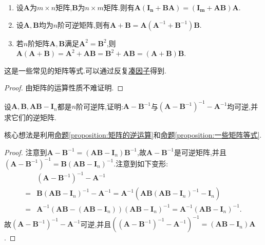 \documentclass[../../main.tex]{subfiles}%
\begin{document}
\begin{proposition}[一些矩阵等式]\label{proposition:一些矩阵等式}
\begin{enumerate}
\item 设$\boldsymbol{A}$为$m\times n$矩阵,$\boldsymbol{B}$为$n\times m$矩阵.则有$\boldsymbol{A}\left( \boldsymbol{I}_{\boldsymbol{n}}+\boldsymbol{BA} \right) =\left( \boldsymbol{I}_{\boldsymbol{m}}+\boldsymbol{AB} \right) \boldsymbol{A}$.

\item 设$\boldsymbol{A},\boldsymbol{B}$均为$n$阶可逆矩阵,则有$\boldsymbol{A}+\boldsymbol{B}=\boldsymbol{A}(\boldsymbol{A}^{-1}+\boldsymbol{B}^{-1})\boldsymbol{B}$.

\item 若$n$阶矩阵$\boldsymbol{A},\boldsymbol{B}$满足$\boldsymbol{A}^2=\boldsymbol{B}^2$,则$\boldsymbol{A}(\boldsymbol{A}+\boldsymbol{B})=\boldsymbol{A}^2+\boldsymbol{AB}=\boldsymbol{B}^2+\boldsymbol{AB}=(\boldsymbol{A}+\boldsymbol{B})\boldsymbol{B}$.
\end{enumerate}
\end{proposition}
\begin{note}
这是一些常见的矩阵等式.可以通过反复\hyperref[proposition:矩阵的逆运算]{凑因子}得到.
\end{note}
\begin{proof}
由矩阵的运算性质不难证明.
\end{proof}

\begin{example}\label{example:凑因子例1}
设\(\boldsymbol{A},\boldsymbol{B},\boldsymbol{AB}-\boldsymbol{I}_{n}\)都是\(n\)阶可逆阵,证明:\(\boldsymbol{A}-\boldsymbol{B}^{-1}\)与\((\boldsymbol{A}-\boldsymbol{B}^{-1})^{-1}-\boldsymbol{A}^{-1}\)均可逆,并求它们的逆矩阵.
\end{example}
\begin{note}
核心想法是利用\hyperref[proposition:矩阵的逆运算]{命题\ref{proposition:矩阵的逆运算}}和\hyperref[proposition:一些矩阵等式]{命题\ref{proposition:一些矩阵等式}}.
\end{note}
\begin{proof}
注意到\(\boldsymbol{A}-\boldsymbol{B}^{-1}=(\boldsymbol{AB}-\boldsymbol{I}_{n})\boldsymbol{B}^{-1}\),故\(\boldsymbol{A}-\boldsymbol{B}^{-1}\)是可逆矩阵,并且\((\boldsymbol{A}-\boldsymbol{B}^{-1})^{-1}=\boldsymbol{B}(\boldsymbol{AB}-\boldsymbol{I}_{n})^{-1}\).注意到如下变形:
\begin{align*}
&(\boldsymbol{A}-\boldsymbol{B}^{-1})^{-1}-\boldsymbol{A}^{-1}\\
=&\boldsymbol{B}(\boldsymbol{AB}-\boldsymbol{I}_{n})^{-1}-\boldsymbol{A}^{-1}=\boldsymbol{A}^{-1}(\boldsymbol{AB}(\boldsymbol{AB}-\boldsymbol{I}_{n})^{-1}-\boldsymbol{I}_{n})\\
=&\boldsymbol{A}^{-1}(\boldsymbol{AB}-(\boldsymbol{AB}-\boldsymbol{I}_{n}))(\boldsymbol{AB}-\boldsymbol{I}_{n})^{-1}=\boldsymbol{A}^{-1}(\boldsymbol{AB}-\boldsymbol{I}_{n})^{-1}.
\end{align*}
故\((\boldsymbol{A}-\boldsymbol{B}^{-1})^{-1}-\boldsymbol{A}^{-1}\)可逆,并且\((( \boldsymbol{A}-\boldsymbol{B}^{-1})^{-1}-\boldsymbol{A}^{-1})^{-1}=(\boldsymbol{AB}-\boldsymbol{I}_{n})\boldsymbol{A}\).
\end{proof}
\end{document}

